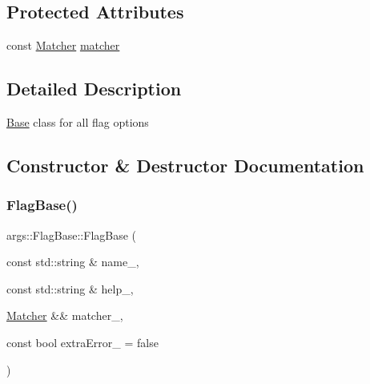 \subsection*{Protected Attributes}
\begin{DoxyCompactItemize}
\item 
const \hyperlink{classargs_1_1_matcher}{Matcher} \hyperlink{classargs_1_1_flag_base_a8035f87d3cbd70a8a57c7a77f2c5d8f1}{matcher}
\end{DoxyCompactItemize}


\subsection{Detailed Description}
\hyperlink{classargs_1_1_base}{Base} class for all flag options 

\subsection{Constructor \& Destructor Documentation}
\mbox{\label{classargs_1_1_flag_base_a9abcf8802dee008411f3b45fff44a3e1}} 
\subsubsection{\texorpdfstring{Flag\+Base()}{FlagBase()}\hspace{0.1cm}{\footnotesize\ttfamily [1/2]}}
{\footnotesize\ttfamily args\+::\+Flag\+Base\+::\+Flag\+Base (\begin{DoxyParamCaption}\item[{const std\+::string \&}]{name\+\_\+,  }\item[{const std\+::string \&}]{help\+\_\+,  }\item[{\hyperlink{classargs_1_1_matcher}{Matcher} \&\&}]{matcher\+\_\+,  }\item[{const bool}]{extra\+Error\+\_\+ = {\ttfamily false} }\end{DoxyParamCaption})\hspace{0.3cm}{\ttfamily [inline]}}

\mbox{\label{classargs_1_1_flag_base_ad99d8085ea99b778f96bad7872900d49}} 
